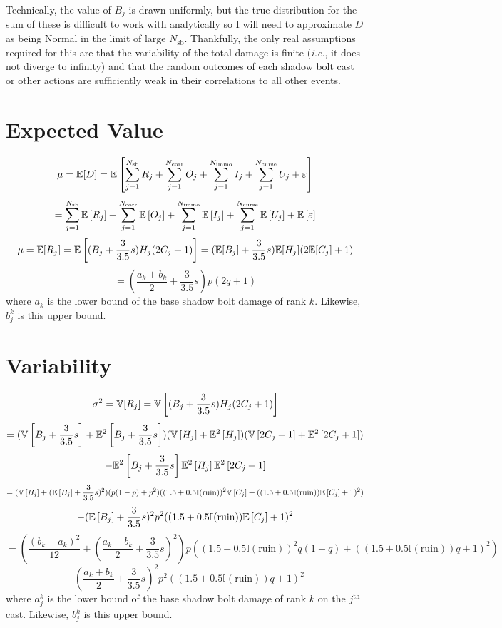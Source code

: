 Technically, the value of $B_j$ is drawn uniformly, but the true distribution for the sum of these is difficult to work with analytically so I will need to approximate $D$ as being Normal in the limit of large $N_\text{sb}$. Thankfully, the only real assumptions required for this are that the variability of the total damage is finite (\textit{i.e.}, it does not diverge to infinity) and that the random outcomes of each shadow bolt cast or other actions are sufficiently weak in their correlations to all other events.



\section*{Expected Value}
%
$$
\mu = \mathbb{E}[D] = \mathbb{E} \left[ \sum_{j=1}^{N_\text{sb}} R_j + \sum_{j=1}^{N_\text{corr}} O_j + \sum_{j=1}^{N_\text{immo}} I_j + \sum_{j=1}^{N_\text{curse}} U_j + 
\varepsilon \right]
$$
$$
= \sum_{j=1}^{N_\text{sb}} \mathbb{E} \left[ R_j \right] + \sum_{j=1}^{N_\text{corr}} \mathbb{E} \left[ O_j \right] + \sum_{j=1}^{N_\text{immo}} \mathbb{E} \left[ I_j \right] + \sum_{j=1}^{N_\text{curse}} \mathbb{E} \left[ U_j \right] + 
\mathbb{E} \left[ \varepsilon \right]
$$
$$
\mu = \mathbb{E}[R_j] = \mathbb{E}\left[ (B_j + \frac{3}{3.5} s) H_j (2 C_j + 1) \right]
= (\mathbb{E}[B_j] + \frac{3}{3.5} s) \mathbb{E}[H_j] (2 \mathbb{E}[C_j] + 1)
$$
$$
= (\frac{a_k + b_k}{2} + \frac{3}{3.5} s) p (2 q + 1)
$$
%
where $a_k$ is the lower bound of the base shadow bolt damage of rank $k$. Likewise, $b_j^k$ is this upper bound.



\section*{Variability}
%
$$
\sigma^2 = \mathbb{V}[R_j] = \mathbb{V}\left[ (B_j + \frac{3}{3.5} s) H_j (2 C_j + 1) \right]
$$
$$
= (\mathbb{V}\left[ B_j + \frac{3}{3.5} s \right] + \mathbb{E}^2\left[ B_j + \frac{3}{3.5} s \right])
(\mathbb{V}\left[ H_j \right] + \mathbb{E}^2\left[ H_j \right])
(\mathbb{V}\left[ 2 C_j + 1 \right] + \mathbb{E}^2\left[ 2 C_j + 1 \right])
$$
$$
- \mathbb{E}^2\left[ B_j + \frac{3}{3.5} s \right] \mathbb{E}^2\left[ H_j \right] \mathbb{E}^2\left[ 2 C_j + 1 \right]
$$
$$
= (\mathbb{V}\left[ B_j \right] + ( \mathbb{E}\left[ B_j \right] + \frac{3}{3.5} s)^2)
(p (1 - p) + p^2)
( (1.5 + 0.5 \mathbb{I}(\text{ruin}))^2 \mathbb{V}\left[ C_j \right] + ((1.5 + 0.5 \mathbb{I}(\text{ruin})) \mathbb{E}\left[ C_j \right] + 1)^2)
$$
$$
- (\mathbb{E}\left[ B_j \right] + \frac{3}{3.5} s)^2 p^2 ((1.5 + 0.5 \mathbb{I}(\text{ruin})) \mathbb{E}\left[ C_j \right] + 1)^2
$$
$$
= (\frac{(b_k-a_k)^2}{12} + ( \frac{a_k + b_k}{2} + \frac{3}{3.5} s)^2)
p
( (1.5 + 0.5 \mathbb{I}(\text{ruin}))^2 q (1 - q) + ((1.5 + 0.5 \mathbb{I}(\text{ruin})) q + 1)^2)
$$
$$
- (\frac{a_k + b_k}{2} + \frac{3}{3.5} s)^2 p^2 ((1.5 + 0.5 \mathbb{I}(\text{ruin})) q + 1)^2
$$
%
where $a_j^k$ is the lower bound of the base shadow bolt damage of rank $k$ on the $j^\text{th}$ cast. Likewise, $b_j^k$ is this upper bound.



